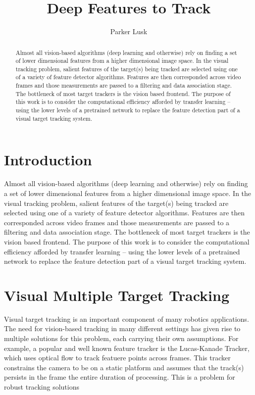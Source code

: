 \documentclass[hidelinks]{article}
\title{Deep Features to Track}
\author{Parker Lusk}
\begin{document}
\maketitle


\begin{abstract}
Almost all vision-based algorithms (deep learning and otherwise) rely on finding a set of lower dimensional features from a higher dimensional image space. In the visual tracking problem, salient features of the target(s) being tracked are selected using one of a variety of feature detector algorithms. Features are then corresponded across video frames and those measurements are passed to a filtering and data association stage. The bottleneck of most target trackers is the vision based frontend. The purpose of this work is to consider the computational efficiency afforded by transfer learning -- using the lower levels of a pretrained network to replace the feature detection part of a visual target tracking system.
\end{abstract}

\section{Introduction}

Almost all vision-based algorithms (deep learning and otherwise) rely on finding a set of lower dimensional features from a higher dimensional image space. In the visual tracking problem, salient features of the target(s) being tracked are selected using one of a variety of feature detector algorithms. Features are then corresponded across video frames and those measurements are passed to a filtering and data association stage. The bottleneck of most target trackers is the vision based frontend. The purpose of this work is to consider the computational efficiency afforded by transfer learning -- using the lower levels of a pretrained network to replace the feature detection part of a visual target tracking system.


\section{Visual Multiple Target Tracking}
Visual target tracking is an important component of many robotics applications. The need for vision-based tracking in many different settings has given rise to multiple solutions for this problem, each carrying their own assumptions. For example, a popular and well known feature tracker is the Lucas-Kanade Tracker, which uses optical flow to track featuere points across frames. This tracker constrains the camera to be on a static platform and assumes that the track(s) persists in the frame the entire duration of processing. This is a problem for robust tracking solutions
\end{document}
